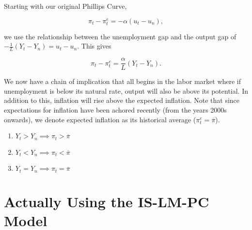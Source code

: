 \documentclass{extarticle}
\begin{document}
Starting with our original Phillips Curve,  


$$\pi_t - \pi^e_t = -\alpha (u_t - u_n),$$

we use the relationship between the unemployment gap and the output gap of $ -\frac{1}{L}(Y_t - Y_n) = u_t - u_n$. This gives  

$$\pi_t - \pi^e_t = \frac{\alpha}{L}(Y_t - Y_n).$$

We now have a chain of implication that all begins in the labor market where if unemployment is below its natural rate, output will also be above its potential. In addition to this, inflation will rise above the expected inflation. 
Note that since expectations for inflation have been achored recently (from the years 2000s onwards), we denote expected inflation as its historical average ($\pi_t^e = \overline{\pi}$). 
\begin{enumerate}
  \item $Y_t > Y_n \implies \pi_t > \overline{\pi}$ 
  \item $Y_t < Y_n \implies \pi_t < \overline{\pi}$
  \item $Y_t = Y_n \implies \pi_t = \overline{\pi} $
\end{enumerate}



\section{Actually Using the IS-LM-PC Model}
\end{document}
